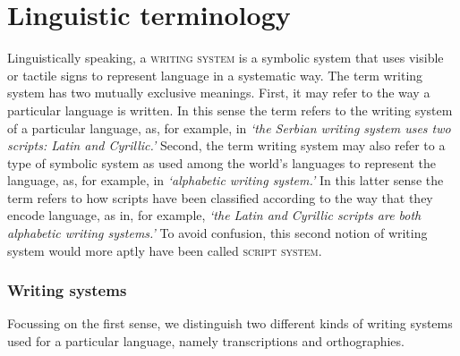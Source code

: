 \section{Linguistic terminology}
\label{linguistic-terminology}

Linguistically speaking, a \textsc{writing system} is a symbolic system that
uses visible or tactile signs to represent language in a systematic way. The
term writing system has two mutually exclusive meanings. First, it may
refer to the way a particular language is written. In this sense the term refers
to the writing system of a particular language, as, for example, in \emph{`the
Serbian writing system uses two scripts: Latin and Cyrillic.'} Second, the term
writing system may also refer to a type of symbolic system as used among the
world's languages to represent the language, as, for example, in
\emph{`alphabetic writing system.'} In this latter sense the term refers to how
scripts have been classified according to the way that they encode language, as
in, for example, \emph{`the Latin and Cyrillic scripts are both alphabetic
writing systems.'} To avoid confusion, this second notion of writing system
would more aptly have been called \textsc{script system}. 

\subsubsection*{Writing systems}

Focussing on the first sense, we distinguish two different kinds of 
writing systems used for a particular language, namely transcriptions and
orthographies.


